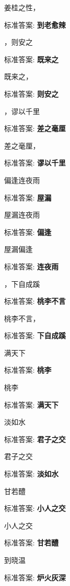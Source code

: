 \documentclass[12pt, a4paper, addpoints]{exam}
\begin{document}
\begin{multicols}{2}
\begin{questions}
\question[1] 姜桂之性，\uline{\qquad\qquad\qquad}

标准答案: \textbf{到老愈辣}

\question[1] \uline{\qquad\qquad\qquad}，则安之

标准答案: \textbf{既来之}

\question[1] 既来之，\uline{\qquad\qquad\qquad}

标准答案: \textbf{则安之}

\question[1] \uline{\qquad\qquad\qquad}，谬以千里

标准答案: \textbf{差之毫厘}

\question[1] 差之毫厘，\uline{\qquad\qquad\qquad}

标准答案: \textbf{谬以千里}

\question[1] \uline{\qquad\qquad\qquad}偏逢连夜雨

标准答案: \textbf{屋漏}

\question[1] 屋漏\uline{\qquad\qquad\qquad}连夜雨

标准答案: \textbf{偏逢}

\question[1] 屋漏偏逢\uline{\qquad\qquad\qquad}

标准答案: \textbf{连夜雨}

\question[1] \uline{\qquad\qquad\qquad}，下自成蹊

标准答案: \textbf{桃李不言}

\question[1] 桃李不言，\uline{\qquad\qquad\qquad}

标准答案: \textbf{下自成蹊}

\question[1] \uline{\qquad\qquad\qquad}满天下

标准答案: \textbf{桃李}

\question[1] 桃李\uline{\qquad\qquad\qquad}

标准答案: \textbf{满天下}

\question[1] \uline{\qquad\qquad\qquad}淡如水

标准答案: \textbf{君子之交}

\question[1] 君子之交\uline{\qquad\qquad\qquad}

标准答案: \textbf{淡如水}

\question[1] \uline{\qquad\qquad\qquad}甘若醴

标准答案: \textbf{小人之交}

\question[1] 小人之交\uline{\qquad\qquad\qquad}

标准答案: \textbf{甘若醴}

\question[1] \uline{\qquad\qquad\qquad}到晓温

标准答案: \textbf{炉火灰深}


\end{questions}
\end{multicols}
\end{document}
